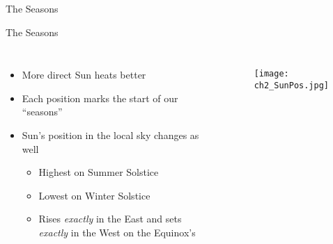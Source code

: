 \documentclass[pdf, aspectratio=169]{beamer}
\begin{document}
\begin{frame}{The Seasons}
\begin{center}
  \end{center}
\end{frame}

\begin{frame}{The Seasons}
  \begin{columns}
	\begin{itemize}
	  \item More direct Sun heats better
	  \item Each position marks the start of our ``seasons''
	  \item Sun's position in the local sky changes as well
		\begin{itemize}
		  \item Highest on Summer Solstice
		  \item Lowest on Winter Solstice
		  \item Rises \emph{exactly} in the East and sets \emph{exactly} in the West on the Equinox's
		\end{itemize}
	\end{itemize}
	\begin{figure}[h!]
	  \centering
	  \texttt{[image: ch2\_SunPos.jpg]}
	\end{figure}
  \end{columns}
\end{frame}
\end{document}
